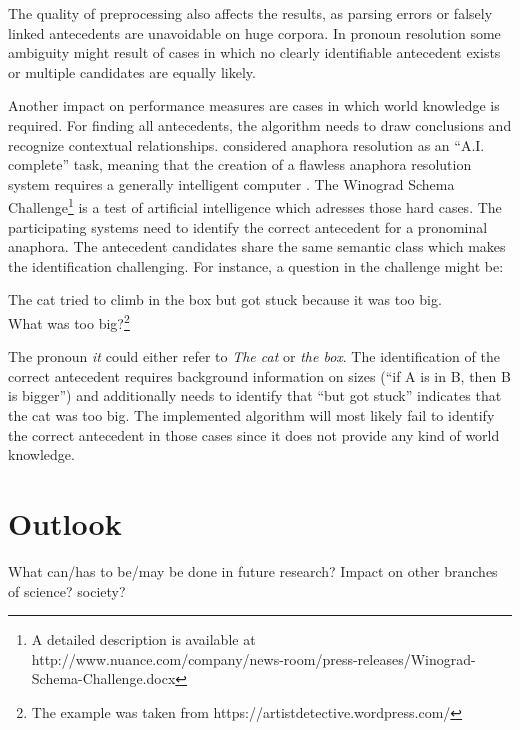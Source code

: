 The quality of preprocessing also affects the results, as parsing errors or falsely linked antecedents are unavoidable on huge corpora. In pronoun resolution some ambiguity might result of cases in which no clearly identifiable antecedent exists or multiple candidates are equally likely. 

Another impact on performance measures are cases in which world knowledge is required. For finding all antecedents, the algorithm needs to draw conclusions and recognize contextual relationships. \cite{baldwin1997cogniac} considered anaphora resolution as an ``A.I. complete'' task, meaning that the creation of a flawless anaphora resolution system requires a generally intelligent computer \citep{shapiro1992encyclopedia}. The Winograd Schema Challenge\footnote{A detailed description is available at http://www.nuance.com/company/news-room/press-releases/Winograd-Schema-Challenge.docx} is a test of artificial intelligence which adresses those hard cases. The participating systems need to identify the correct antecedent for a pronominal anaphora. The antecedent candidates share the same semantic class which makes the identification challenging. For instance, a question in the challenge might be:

\begin{addmargin}[25pt]{25pt}
The cat tried to climb in the box but got stuck because it was too big.\\ What was too big?\footnote{The example was taken from https://artistdetective.wordpress.com/}
\end{addmargin}

The pronoun \textit{it} could either refer to \textit{The cat} or \textit{the box}. The identification of the correct antecedent requires background information on sizes (``if A is in B, then B is bigger'') and additionally needs to identify that ``but got stuck'' indicates that the cat was too big. The implemented algorithm will most likely fail to identify the correct antecedent in those cases since it does not provide any kind of world knowledge.

\section{Outlook}

What can/has to be/may be done in future research? Impact on other branches of science? society?